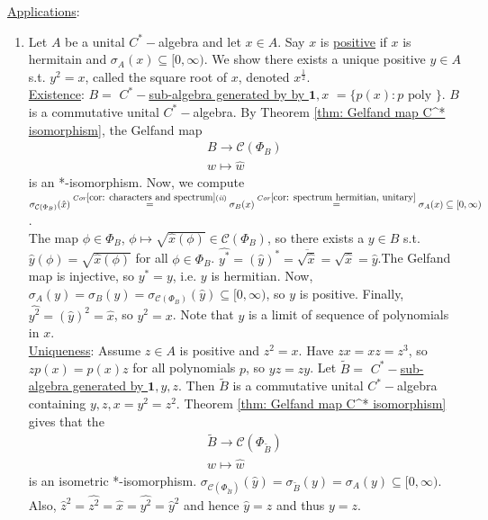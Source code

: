 \documentclass{article}
\begin{document}
\noindent\underline{Applications}:
\begin{enumerate}
    \item Let $A$ be a unital $C^*-$algebra and let $x\in A$. Say $x$ is \noindent\underline{positive} if $x$ is hermitain and $\sigma_A(x)\subseteq[0,\infty)$. We show there exists a unique positive $y\in A$ s.t. $y^2 = x$, called the square root of $x$, denoted $x^{\frac{1}{2}}$.\\

    \noindent\underline{Existence}: $B=$ \noindent\underline{$C^*-$sub-algebra generated by by $\mathbf{1}, x$} $=\{p(x): p \text{ poly }\}$. $B$ is a commutative unital $C^*-$algebra. By Theorem \ref{thm: Gelfand map C^* isomorphism}, the Gelfand map 
    $$
    \begin{array}{cc}
         B\to \mathcal{C}(\Phi_B)\\
         w\mapsto \hat{w}
    \end{array}
    $$
    is an *-isomorphism. Now, we compute $\sigma_{\mathcal{C}(\Phi_B)}(\hat{x})\stackrel{Cor \ref{cor: characters and spectrum} (\textit{ii})}{=}\sigma_B(x) \stackrel{Cor \ref{cor: spectrum hermitian, unitary}}{=}\sigma_A(x)\subseteq[0,\infty)$.\\
    
    The map $\phi\in\Phi_B$, $\phi \mapsto \sqrt{\hat{x}(\phi)}\in \mathcal{C}(\Phi_B)$, so there exists a $y\in B$ s.t. $\hat{y}(\phi) = \sqrt{\hat{x}(
    \phi)}$ for all $\phi\in \Phi_B$. $\hat{y^*} = (\hat{y})^* = \overline{\sqrt{\hat{x}}}=\sqrt{\hat{x}} = \hat{y}$.The Gelfand map is injective, so $y^* = y$, i.e. $y$ is hermitian. Now, $\sigma_A(y) = \sigma_B(y) = \sigma_{\mathcal{C}(\Phi_B)}(\hat{y})\subseteq[0,\infty)$, so $y$ is positive. Finally, $\hat{y^2}=(\hat{y})^2=\hat{x}$, so $y^2 = x$. Note that $y$ is a limit of sequence of polynomials in $x$.\\

    \noindent\underline{Uniqueness}: Assume $z\in A$ is positive and $z^2 = x$. Have $zx = xz = z^3$, so $zp(x) = p(x)z$ for all polynomials $p$, so $yz = zy$. Let $\tilde{B}=$ \noindent\underline{$C^*-$sub-algebra generated by $\mathbf{1}, y,z$}. Then $\tilde{B}$ is a commutative unital $C^*-$algebra containing $y,z, x = y^2 = z^2$. Theorem \ref{thm: Gelfand map C^* isomorphism} gives that the 
    $$
    \begin{array}{cc}
         \tilde{B}\to \mathcal{C}(\Phi_{\tilde{B}})\\
         w\mapsto \hat{w}
    \end{array}
    $$
    is an isometric *-isomorphism. $\sigma_{\mathcal{C}(\Phi_{\tilde{B}})}(\hat{y})=\sigma_{\tilde{B}}(y) =\sigma_A(y)\subseteq[0,\infty)$. Also, $\hat{z}^2=\widehat{z^2}=\hat{x}=\widehat{y^2}=\hat{y}^2$ and hence $\hat{y}=\hat{z}$ and thus $y = z$.\\


\end{enumerate}
\end{document}
